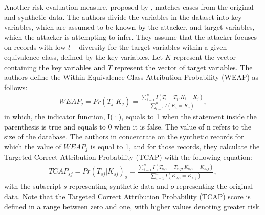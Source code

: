 Another risk evaluation measure, proposed by \citet{taub2018differential}, matches cases from the original and synthetic data. The authors divide the variables in the dataset into key variables, which are assumed to be known by the attacker, and target variables, which the attacker is attempting to infer. They assume that the attacker focuses on records with low $l-$diversity for the target variables within a given equivalence class, defined by the key variables. Let $K$ represent the vector containing the key variables and $T$ represent the vector of target variables. The authors define the Within Equivalence Class Attribution Probability (WEAP) as follows:
\begin{align*}
    \label{equ:weap}
    WEAP_{j}=Pr(T_{j}|K_j)=\frac{\sum_{i=1}^{n}I(T_i=T_j,K_i=K_j)}{\sum_{i=1}^{n}I(K_i=K_j)},
\end{align*}
in which, the indicator function, I(·), equals to 1 when the statement inside the parenthesis is true and equals to 0 when it is false. The value of n refers to the size of the database. The authors in \citet{taub2018differential} concentrate on the synthetic records for which the value of $WEAP_j$ is equal to 1, and for those records, they calculate the Targeted Correct Attribution Probability (TCAP) with the following equation:
\begin{align*}
    \label{equ:tcap}
    TCAP_{sj}=Pr(T_{sj}|K_{sj})_{o}=\frac{\sum_{i=1}^{n}I(T_{o,i}=T_{s,j},K_{o,i}=K_{s,j})}{\sum_{i=1}^{n}I(K_{o,i}=K_{s,j})},
\end{align*}
with the subscript $s$ representing synthetic data and $o$ representing the original data. Note that the Targeted Correct Attribution Probability (TCAP) score is defined in a range between zero and one, with higher values denoting greater risk.

